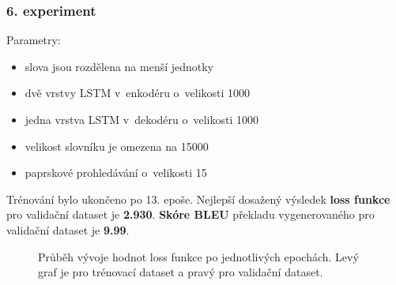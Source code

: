 \subsubsection{6. experiment}\label{experiment6}
Parametry:
\begin{itemize}
  \item slova jsou rozdělena na menší jednotky
  \item dvě vrstvy LSTM v~enkodéru o~velikosti 1000
  \item jedna vrstva LSTM v~dekodéru o~velikosti 1000
  \item velikost slovníku je omezena na 15000
  \item paprskové prohledávání o~velikosti 15
\end{itemize}

Trénování bylo ukončeno po 13. epoše. Nejlepší dosažený výsledek \textbf{loss funkce} pro validační dataset je \textbf{2.930}. \textbf{Skóre BLEU} překladu vygenerovaného pro validační dataset je \textbf{9.99}.

\begin{figure}[H]
    \begin{center}
    \end{center}
	\caption{Průběh vývoje hodnot loss funkce po jednotlivých epochách. Levý graf je pro trénovací dataset a pravý pro validační dataset.}
\end{figure}


